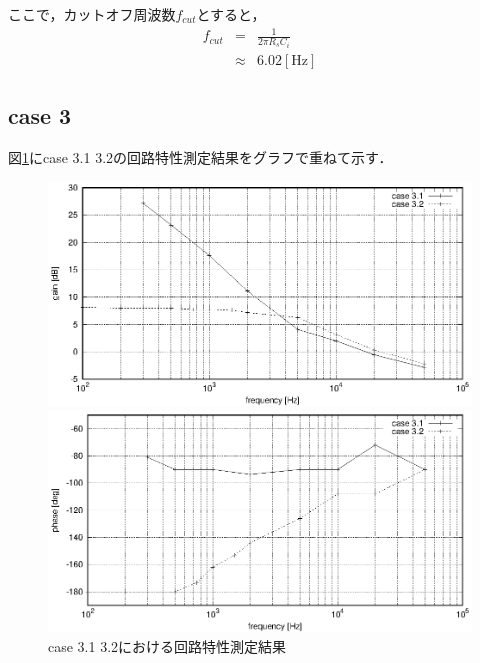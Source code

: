 \documentclass[dvipdfmx,titlepage,a4j]{jsarticle}  %
\begin{document}
ここで，カットオフ周波数$f_{cut}$とすると，
\begin{eqnarray}
  f_{cut} &=& \frac{1}{2\pi R_s C_i}\\
  &\approx& 6.02 \mathrm{[Hz]}
\end{eqnarray}

\subsection{case 3}
図\ref{fig:gr:case3}にcase 3.1 3.2の回路特性測定結果をグラフで重ねて示す．
\begin{figure}[H]
  \centering
  \begin{minipage}{8cm}
    \centering
    \includegraphics[keepaspectratio, scale=0.6]{../data/case3-g.eps}
  \end{minipage}
  \begin{minipage}{8cm}
    \centering
    \includegraphics[keepaspectratio, scale=0.6]{../data/case3-f.eps}
  \end{minipage}
  \caption{case 3.1 3.2における回路特性測定結果}
  \label{fig:gr:case3}
\end{figure}
\end{document}

